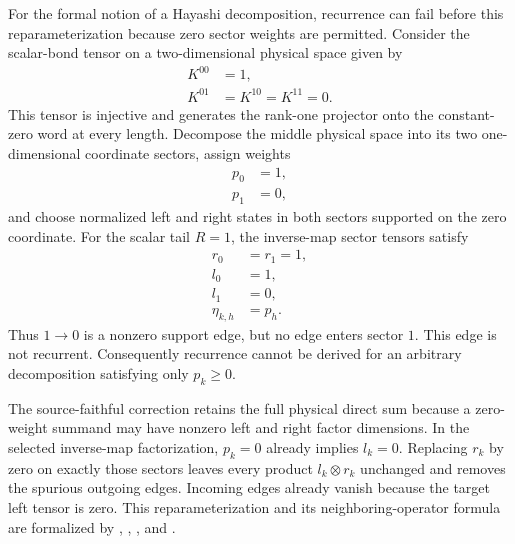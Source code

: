 \documentclass{article}
\begin{document}
For the formal notion of a Hayashi decomposition, recurrence can fail before
this reparameterization because zero sector weights are permitted. Consider
the scalar-bond tensor on a two-dimensional physical space given by
\begin{align}
    K^{00}
        &=1,
    \label{eq:cpgsv17_mpdo_sal_zcl_eta_local_structure_zero_weight_example_nonzero_slice}\\
    K^{01}
        &=K^{10}
        =K^{11}
        =0.
    \label{eq:cpgsv17_mpdo_sal_zcl_eta_local_structure_zero_weight_example_zero_slices}
\end{align}
This tensor is injective and generates the rank-one projector onto the
constant-zero word at every length. Decompose the middle physical space into
its two one-dimensional coordinate sectors, assign weights
\begin{align}
    p_0
        &=1,
    \label{eq:cpgsv17_mpdo_sal_zcl_eta_local_structure_zero_weight_example_active_weight}\\
    p_1
        &=0,
    \label{eq:cpgsv17_mpdo_sal_zcl_eta_local_structure_zero_weight_example_inactive_weight}
\end{align}
and choose normalized left and right states in both sectors supported on the
zero coordinate. For the scalar tail $R=1$, the inverse-map sector tensors
satisfy
\begin{align}
    r_0
        &=r_1
        =1,
    \label{eq:cpgsv17_mpdo_sal_zcl_eta_local_structure_zero_weight_example_right_tensors}\\
    l_0
        &=1,
    \label{eq:cpgsv17_mpdo_sal_zcl_eta_local_structure_zero_weight_example_active_left_tensor}\\
    l_1
        &=0,
    \label{eq:cpgsv17_mpdo_sal_zcl_eta_local_structure_zero_weight_example_inactive_left_tensor}\\
    \eta_{k,h}
        &=p_h.
    \label{eq:cpgsv17_mpdo_sal_zcl_eta_local_structure_zero_weight_example_neighbor_operator}
\end{align}
Thus $1\to 0$ is a nonzero support edge, but no edge enters sector $1$. This
edge is not recurrent. Consequently recurrence cannot be derived for an
arbitrary decomposition satisfying only $p_k\geq 0$.

The source-faithful correction retains the full physical direct sum because a
zero-weight summand may have nonzero left and right factor dimensions. In the
selected inverse-map factorization, $p_k=0$ already implies $l_k=0$. Replacing
$r_k$ by zero on exactly those sectors leaves every product
$l_k\otimes r_k$ unchanged and removes the spurious outgoing edges. Incoming
edges already vanish because the target left tensor is zero. This
reparameterization and its neighboring-operator formula are formalized by
,
,
,
and
.
\end{document}
